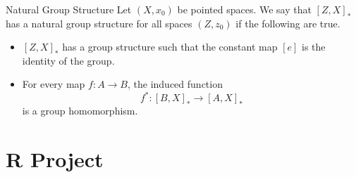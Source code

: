 \documentclass[a4paper]{article}
\begin{document}
\begin{defn}{Natural Group Structure}{} Let $(X,x_0)$ be pointed spaces. We say that $[Z,X]_\ast$ has a natural group structure for all spaces $(Z,z_0)$ if the following are true. 
\begin{itemize}
\item $[Z,X]_\ast$ has a group structure such that the constant map $[e]$ is the identity of the group. 
\item For every map $f:A\to B$, the induced function $$f^\ast:[B,X]_\ast\to[A,X]_\ast$$ is a group homomorphism. 
\end{itemize}
\end{defn}


\pagebreak
\section{R Project}
\end{document}

